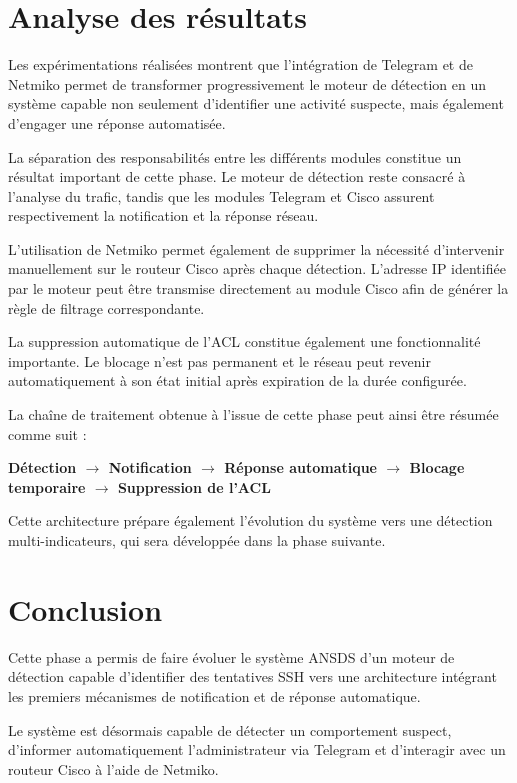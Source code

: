 \section{Analyse des résultats}

Les expérimentations réalisées montrent que l'intégration de Telegram et de Netmiko permet de transformer progressivement le moteur de détection en un système capable non seulement d'identifier une activité suspecte, mais également d'engager une réponse automatisée.

La séparation des responsabilités entre les différents modules constitue un résultat important de cette phase. Le moteur de détection reste consacré à l'analyse du trafic, tandis que les modules Telegram et Cisco assurent respectivement la notification et la réponse réseau.

L'utilisation de Netmiko permet également de supprimer la nécessité d'intervenir manuellement sur le routeur Cisco après chaque détection. L'adresse IP identifiée par le moteur peut être transmise directement au module Cisco afin de générer la règle de filtrage correspondante.

La suppression automatique de l'ACL constitue également une fonctionnalité importante. Le blocage n'est pas permanent et le réseau peut revenir automatiquement à son état initial après expiration de la durée configurée.

La chaîne de traitement obtenue à l'issue de cette phase peut ainsi être résumée comme suit :

\begin{center}
\textbf{Détection $\rightarrow$ Notification $\rightarrow$ Réponse automatique $\rightarrow$ Blocage temporaire $\rightarrow$ Suppression de l'ACL}
\end{center}

Cette architecture prépare également l'évolution du système vers une détection multi-indicateurs, qui sera développée dans la phase suivante.

\section{Conclusion}

Cette phase a permis de faire évoluer le système ANSDS d'un moteur de détection capable d'identifier des tentatives SSH vers une architecture intégrant les premiers mécanismes de notification et de réponse automatique.

Le système est désormais capable de détecter un comportement suspect, d'informer automatiquement l'administrateur via Telegram et d'interagir avec un routeur Cisco à l'aide de Netmiko.

